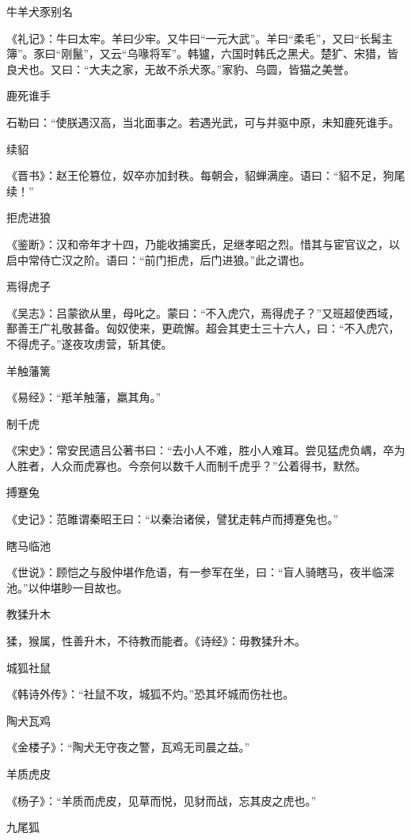 \documentclass[a4paper,12pt,UTF8,twoside]{ctexbook}
\begin{document}
    牛羊犬豕别名
    
    《礼记》：牛曰太牢。羊曰少牢。又牛曰“一元大武”。羊曰“柔毛”，又曰“长髯主簿”。豕曰“刚鬣”，又云“乌喙将军”。韩獹，六国时韩氏之黑犬。楚犷、宋猎，皆良犬也。又曰：“大夫之家，无故不杀犬豕。”家豹、乌圆，皆猫之美誉。
    
    鹿死谁手
    
    石勒曰：“使朕遇汉高，当北面事之。若遇光武，可与并驱中原，未知鹿死谁手。
    
    续貂
    
    《晋书》：赵王伦篡位，奴卒亦加封秩。每朝会，貂蝉满座。语曰：“貂不足，狗尾续！”
    
    拒虎进狼
    
    《鉴断》：汉和帝年才十四，乃能收捕窦氏，足继孝昭之烈。惜其与宦官议之，以启中常侍亡汉之阶。语曰：“前门拒虎，后门进狼。”此之谓也。
    
    焉得虎子
    
    《吴志》：吕蒙欲从里，母叱之。蒙曰：“不入虎穴，焉得虎子？”又班超使西域，鄯善王广礼敬甚备。匈奴使来，更疏懈。超会其吏士三十六人，曰：“不入虎穴，不得虎子。”遂夜攻虏营，斩其使。
    
    羊触藩篱
    
    《易经》：“羝羊触藩，羸其角。”
    
    制千虎
    
    《宋史》：常安民遗吕公著书曰：“去小人不难，胜小人难耳。尝见猛虎负嵎，卒为人胜者，人众而虎寡也。今奈何以数千人而制千虎乎？”公着得书，默然。
    
    搏蹇兔
    
    《史记》：范雎谓秦昭王曰：“以秦治诸侯，譬犹走韩卢而搏蹇兔也。”
    
    瞎马临池
    
    《世说》：顾恺之与殷仲堪作危语，有一参军在坐，曰：“盲人骑瞎马，夜半临深池。”以仲堪眇一目故也。
    
    教猱升木
    
    猱，猴属，性善升木，不待教而能者。《诗经》：毋教猱升木。
    
    城狐社鼠
    
    《韩诗外传》：“社鼠不攻，城狐不灼。”恐其坏城而伤社也。
    
    陶犬瓦鸡
    
    《金楼子》：“陶犬无守夜之警，瓦鸡无司晨之益。”
    
    羊质虎皮
    
    《杨子》：“羊质而虎皮，见草而悦，见豺而战，忘其皮之虎也。”
    
    九尾狐
    
\end{document}

